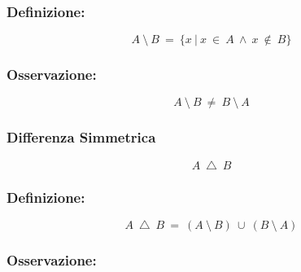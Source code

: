         \subsubsection*{Definizione:}
        
        \begin{Large}
            \begin{equation*}
                A\ \setminus\ B\ =\ \{x\ |\ x\ \in\ A\ \land\ x\ \notin\ B\}
            \end{equation*}
        \end{Large}

        \subsubsection*{Osservazione:}

        \begin{Large}
            \begin{equation*}
                A\ \setminus\ B\ \ne\ B\ \setminus\ A
            \end{equation*}
        \end{Large}

        \subsubsection{Differenza Simmetrica}
        \begin{Large}
            \begin{equation*}
                A\ \bigtriangleup\ B
            \end{equation*}
        \end{Large}
        
        \subsubsection*{Definizione:}
        
        \begin{Large}
            \begin{equation*}
                A\ \bigtriangleup\ B\ =\ (A\ \setminus\ B)\ \cup\ (B\ \setminus\ A)
            \end{equation*}
        \end{Large}

        \subsubsection*{Osservazione:}

